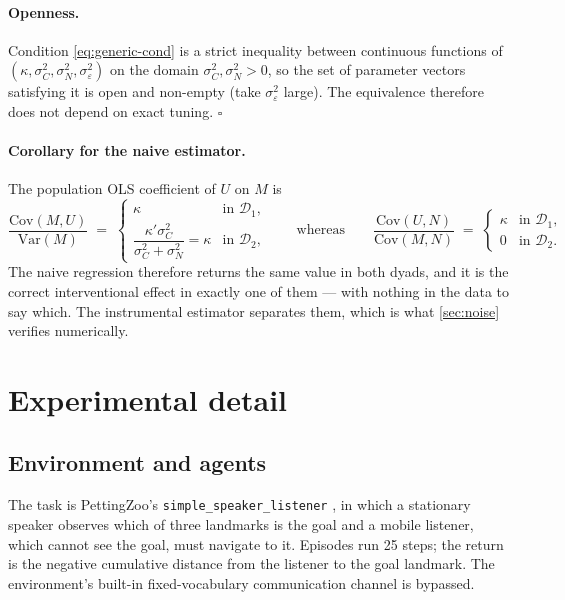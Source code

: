 \documentclass[11pt,a4paper]{article}
\theoremstyle{plain}
\theoremstyle{definition}
\theoremstyle{remark}
\newcommand{\Dy}{\mathcal{D}}
\newcommand{\Var}{\mathrm{Var}}
\newcommand{\Cov}{\mathrm{Cov}}
\newcommand{\code}[1]{\texttt{\small #1}}
\begin{document}
\begin{appendices}
\paragraph{Openness.}
Condition \eqref{eq:generic-cond} is a strict inequality between continuous functions of
$(\kappa, \sigma_C^2, \sigma_N^2, \sigma_\varepsilon^2)$ on the domain $\sigma_C^2, \sigma_N^2 > 0$, so
the set of parameter vectors satisfying it is open and non-empty (take $\sigma_\varepsilon^2$ large).
The equivalence therefore does not depend on exact tuning. \hfill$\square$

\paragraph{Corollary for the naive estimator.}
The population OLS coefficient of $U$ on $M$ is
\[
\frac{\Cov(M,U)}{\Var(M)} \;=\;
\begin{cases}
\kappa & \text{in } \Dy_1,\\[4pt]
\dfrac{\kappa' \sigma_C^2}{\sigma_C^2 + \sigma_N^2} = \kappa & \text{in } \Dy_2,
\end{cases}
\qquad\text{whereas}\qquad
\frac{\Cov(U,N)}{\Cov(M,N)} \;=\;
\begin{cases}
\kappa & \text{in } \Dy_1,\\[4pt]
0 & \text{in } \Dy_2.
\end{cases}
\]
The naive regression therefore returns the same value in both dyads, and it is the correct interventional
effect in exactly one of them --- with nothing in the data to say which. The instrumental estimator separates
them, which is what \cref{sec:noise} verifies numerically.

\section{Experimental detail}\label{app:experiment}

\subsection{Environment and agents}

The task is PettingZoo's \code{simple\_speaker\_listener} \citep{terry2021pettingzoo}, in which a stationary
speaker observes which of three landmarks is the goal and a mobile listener, which cannot see the goal, must
navigate to it. Episodes run 25 steps; the return is the negative cumulative distance from the listener to the
goal landmark. The environment's built-in fixed-vocabulary communication channel is bypassed.


\end{appendices}
\end{document}
